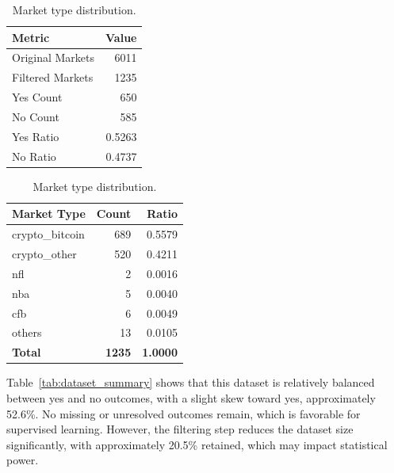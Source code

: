 \documentclass[11pt]{article}
\begin{document}
\begin{table}[ht!]
    \centering
    \begin{minipage}{0.45\textwidth}
        \centering
        \caption{Summary statistics of the dataset.}
        \label{tab:dataset_summary}
        \begin{tabular}{@{}lr@{}}
            \toprule
            Metric & Value \\
            \midrule
            Original Markets & 6011 \\
            Filtered Markets & 1235 \\
            Yes Count & 650 \\
            No Count & 585 \\
            Yes Ratio & 0.5263 \\
            No Ratio & 0.4737 \\
            \bottomrule
        \end{tabular}
    \end{minipage}
    \hfill %
    \begin{minipage}{0.5\textwidth}
        \centering
        \caption{Market type distribution.}
        \label{tab:market_type_distribution}
        \begin{tabular}{@{}lrr@{}}
            \toprule
            Market Type & Count & Ratio \\
            \midrule
            crypto\_bitcoin & 689 & 0.5579 \\
            crypto\_other & 520 & 0.4211 \\
            nfl & 2 & 0.0016 \\
            nba & 5 & 0.0040 \\
            cfb & 6 & 0.0049 \\
            others & 13 & 0.0105 \\
            \textbf{Total} & \textbf{1235} & \textbf{1.0000} \\
            \bottomrule
        \end{tabular}
    \end{minipage}
\end{table}

Table~\ref{tab:dataset_summary} shows that this dataset is relatively balanced between yes and no outcomes, with a slight skew toward yes, approximately 52.6\%. No missing or unresolved outcomes remain, which is favorable for supervised learning. However, the filtering step reduces the dataset size significantly, with approximately 20.5\% retained, which may impact statistical power.
\end{document}
